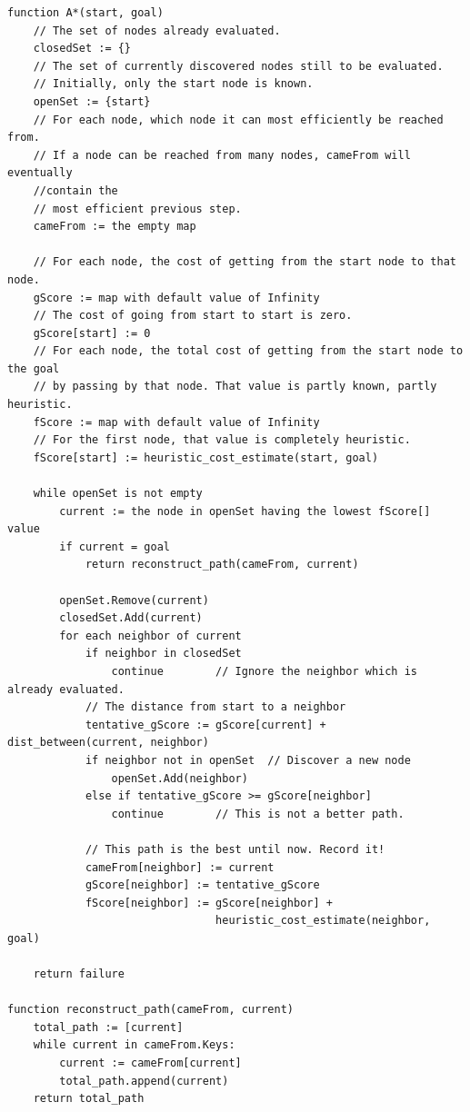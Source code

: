 \begin{verbatim}
function A*(start, goal)
    // The set of nodes already evaluated.
    closedSet := {}
    // The set of currently discovered nodes still to be evaluated.
    // Initially, only the start node is known.
    openSet := {start}
    // For each node, which node it can most efficiently be reached from.
    // If a node can be reached from many nodes, cameFrom will eventually 
   	//contain the
    // most efficient previous step.
    cameFrom := the empty map

    // For each node, the cost of getting from the start node to that node.
    gScore := map with default value of Infinity
    // The cost of going from start to start is zero.
    gScore[start] := 0 
    // For each node, the total cost of getting from the start node to the goal
    // by passing by that node. That value is partly known, partly heuristic.
    fScore := map with default value of Infinity
    // For the first node, that value is completely heuristic.
    fScore[start] := heuristic_cost_estimate(start, goal)

    while openSet is not empty
        current := the node in openSet having the lowest fScore[] value
        if current = goal
            return reconstruct_path(cameFrom, current)

        openSet.Remove(current)
        closedSet.Add(current)
        for each neighbor of current
            if neighbor in closedSet
                continue		// Ignore the neighbor which is already evaluated.
            // The distance from start to a neighbor
            tentative_gScore := gScore[current] + dist_between(current, neighbor)
            if neighbor not in openSet	// Discover a new node
                openSet.Add(neighbor)
            else if tentative_gScore >= gScore[neighbor]
                continue		// This is not a better path.

            // This path is the best until now. Record it!
            cameFrom[neighbor] := current
            gScore[neighbor] := tentative_gScore
            fScore[neighbor] := gScore[neighbor] +
                                heuristic_cost_estimate(neighbor, goal)

    return failure

function reconstruct_path(cameFrom, current)
    total_path := [current]
    while current in cameFrom.Keys:
        current := cameFrom[current]
        total_path.append(current)
    return total_path
\end{verbatim}

